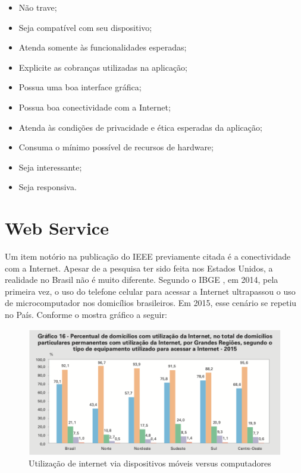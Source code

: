 \begin{itemize}
\setlength\itemsep{0em}
\item Não trave;
\item Seja compatível com seu dispositivo;
\item Atenda somente às funcionalidades esperadas;
\item Explicite as cobranças utilizadas na aplicação; 
\item Possua uma boa interface gráfica;
\item Possua boa conectividade com a Internet;
\item Atenda às condições de privacidade e ética esperadas da aplicação;
\item Consuma o mínimo possível de recursos de hardware;
\item Seja interessante;
\item Seja responsiva.
\end{itemize}
 
 \section{Web Service}
 Um item notório na publicação do IEEE \cite{Khalid2015} previamente citada
  é a conectividade com a Internet. Apesar de a pesquisa ter sido feita nos Estados 
  Unidos, a realidade no Brasil não é muito diferente. Segundo o IBGE \cite{ibge2015}, 
 em 2014, pela primeira vez, o uso do telefone celular para acessar a Internet 
 ultrapassou o uso de microcomputador nos domicílios brasileiros. \cite{ibge2015}
 Em 2015, esse cenário se repetiu no País. \cite{ibge2015} Conforme o mostra
 gráfico a seguir:
 
 \begin{figure}[htb]
    \centering
    \includegraphics[width=\textwidth]{images/ibge_celulares_computadores}
    \caption[Utilização de internet via dispositivos móveis versus computadores]
    {Utilização de internet via dispositivos móveis versus computadores \cite{ibge2015}}
    \label{fig:ibge_celulares_computadores}
\end{figure}

